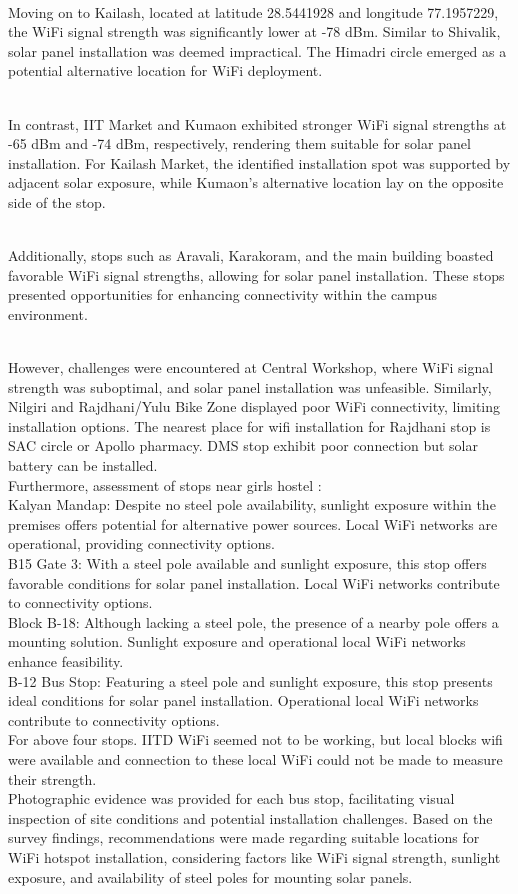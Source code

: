 \documentclass[12pt]{article} %
\begin{document}
\\Moving on to Kailash, located at latitude 28.5441928 and longitude 77.1957229, the WiFi signal strength was significantly lower at -78 dBm. Similar to Shivalik, solar panel installation was deemed impractical. The Himadri circle emerged as a potential alternative location for WiFi deployment.

\\In contrast, IIT Market and Kumaon exhibited stronger WiFi signal strengths at -65 dBm and -74 dBm, respectively, rendering them suitable for solar panel installation. For Kailash Market, the identified installation spot was supported by adjacent solar exposure, while Kumaon's alternative location lay on the opposite side of the stop.

\\Additionally, stops such as Aravali, Karakoram, and the main building boasted favorable WiFi signal strengths, allowing for solar panel installation. These stops presented opportunities for enhancing connectivity within the campus environment.

\\However, challenges were encountered at Central Workshop, where WiFi signal strength was suboptimal, and solar panel installation was unfeasible. Similarly, Nilgiri and Rajdhani/Yulu Bike Zone displayed poor WiFi connectivity, limiting installation options. The nearest place for wifi installation for Rajdhani stop is SAC circle or Apollo pharmacy. DMS stop exhibit poor connection but solar battery can be installed.
\\Furthermore,  assessment of stops near girls hostel :
\\Kalyan Mandap: Despite no steel pole availability, sunlight exposure within the premises offers potential for alternative power sources. Local WiFi networks are operational, providing connectivity options.
\\B15 Gate 3: With a steel pole available and sunlight exposure, this stop offers favorable conditions for solar panel installation. Local WiFi networks contribute to connectivity options.
\\Block B-18: Although lacking a steel pole, the presence of a nearby pole offers a mounting solution. Sunlight exposure and operational local WiFi networks enhance feasibility.
\\B-12 Bus Stop: Featuring a steel pole and sunlight exposure, this stop presents ideal conditions for solar panel installation. Operational local WiFi networks contribute to connectivity options.
\\For above four stops. IITD WiFi seemed not to be working, but local blocks wifi were available and connection to these local WiFi could not be made to measure their strength.
\\Photographic evidence was provided for each bus stop, facilitating visual inspection of site conditions and potential installation challenges.
Based on the survey findings, recommendations were made regarding suitable locations for WiFi hotspot installation, considering factors like WiFi signal strength, sunlight exposure, and availability of steel poles for mounting solar panels.
\end{document}
